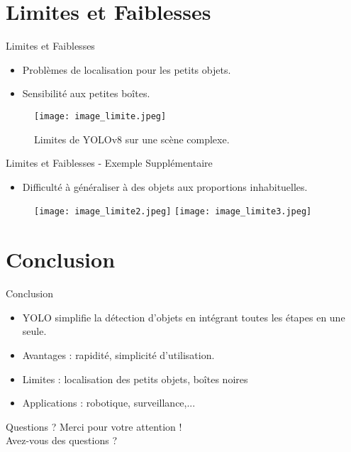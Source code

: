 \documentclass{beamer}
\begin{document}

\section{Limites et Faiblesses}
\begin{frame}{Limites et Faiblesses}
    \begin{itemize}
        \item Problèmes de localisation pour les petits objets.\pause
        \item Sensibilité aux petites boîtes.\pause
    \end{itemize}

    \begin{figure}
        \centering
        \texttt{[image: image\_limite.jpeg]}
        \caption{Limites de YOLOv8 sur une scène complexe.}
    \end{figure}
\end{frame}


\begin{frame}{Limites et Faiblesses - Exemple Supplémentaire}
    \begin{itemize}
        \item Difficulté à généraliser à des objets aux proportions inhabituelles.\pause
    \end{itemize}
    \begin{figure}
        \centering
        \texttt{[image: image\_limite2.jpeg]}\pause
        \hspace{0.5cm}
        \texttt{[image: image\_limite3.jpeg]}
    \end{figure}
\end{frame}





\section{Conclusion}
\begin{frame}{Conclusion}
    \begin{itemize}
        \item YOLO simplifie la détection d'objets en intégrant toutes les étapes en une seule.
        \item Avantages : rapidité, simplicité d'utilisation.
        \item Limites : localisation des petits objets, boîtes noires 
        \item Applications : robotique, surveillance,...
    \end{itemize}
\end{frame}




\begin{frame}{Questions ?}
    \centering
    Merci pour votre attention ! \\
    Avez-vous des questions ?
\end{frame}
\end{document}
